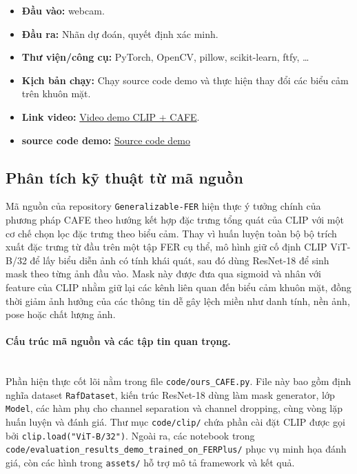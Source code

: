 \begin{itemize}
    \item \textbf{Đầu vào:}  webcam.
    \item \textbf{Đầu ra:} Nhãn dự đoán, quyết định xác minh.
    \item \textbf{Thư viện/công cụ:} PyTorch, OpenCV, pillow, scikit-learn, ftfy, \dots
    \item \textbf{Kịch bản chạy:} Chạy source code demo và thực hiện thay đổi các biểu cảm trên khuôn mặt.
    \item \textbf{Link video:} \href{https://drive.google.com/drive/folders/1BC7GI7or8lLDn4QfEYbvI_TSbq7936Fp}{Video demo CLIP + CAFE}.
    \item \textbf{source code demo:} \href{https://drive.google.com/drive/folders/1NvncPUKAVVe-aT1ahBL36FnnUOI2ZT84?usp=drive_link}{Source code demo}
\end{itemize}

\subsection{Phân tích kỹ thuật từ mã nguồn}

Mã nguồn của repository \texttt{Generalizable-FER} hiện thực ý tưởng chính của phương pháp CAFE theo hướng kết hợp đặc trưng tổng quát của CLIP với một cơ chế chọn lọc đặc trưng theo biểu cảm. Thay vì huấn luyện toàn bộ bộ trích xuất đặc trưng từ đầu trên một tập FER cụ thể, mô hình giữ cố định CLIP ViT-B/32 để lấy biểu diễn ảnh có tính khái quát, sau đó dùng ResNet-18 để sinh mask theo từng ảnh đầu vào. Mask này được đưa qua sigmoid và nhân với feature của CLIP nhằm giữ lại các kênh liên quan đến biểu cảm khuôn mặt, đồng thời giảm ảnh hưởng của các thông tin dễ gây lệch miền như danh tính, nền ảnh, pose hoặc chất lượng ảnh.

\paragraph{Cấu trúc mã nguồn và các tập tin quan trọng.}\mbox{}\\
Phần hiện thực cốt lõi nằm trong file \texttt{code/ours\_CAFE.py}. File này bao gồm định nghĩa dataset \texttt{RafDataset}, kiến trúc ResNet-18 dùng làm mask generator, lớp \texttt{Model}, các hàm phụ cho channel separation và channel dropping, cùng vòng lặp huấn luyện và đánh giá. Thư mục \texttt{code/clip/} chứa phần cài đặt CLIP được gọi bởi \texttt{clip.load("ViT-B/32")}. Ngoài ra, các notebook trong \texttt{code/evaluation\_results\_demo\_trained\_on\_FERPlus/} phục vụ minh họa đánh giá, còn các hình trong \texttt{assets/} hỗ trợ mô tả framework và kết quả.

